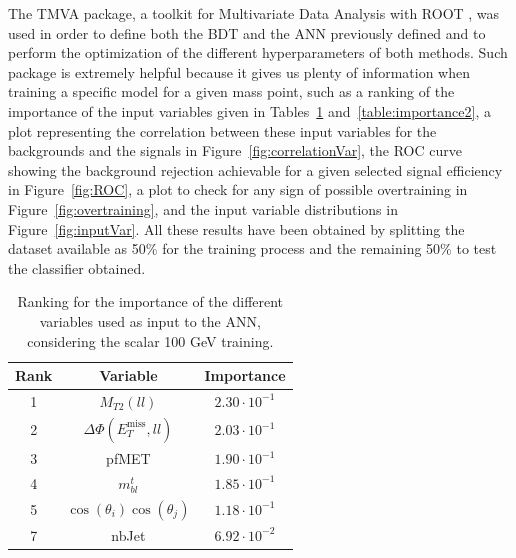 \documentclass[a4paper, 10pt, openright]{report}
\begin{document}
The TMVA package, a toolkit for Multivariate Data Analysis with ROOT \cite{TMVA}, was used in order to define both the \ac{BDT} and the \ac{ANN} previously defined and to perform the optimization of the different hyperparameters of both methods. Such package is extremely helpful because it gives us plenty of information when training a specific model for a given mass point, such as a ranking of the importance of the input variables given in Tables~\ref{table:importance1} and~\ref{table:importance2}, a plot representing the correlation between these input variables for the backgrounds and the signals in Figure~\ref{fig:correlationVar}, the \ac{ROC} curve showing the background rejection achievable for a given selected signal efficiency in Figure~\ref{fig:ROC}, a plot to check for any sign of possible overtraining in Figure~\ref{fig:overtraining}, and the input variable distributions in Figure~\ref{fig:inputVar}. All these results have been obtained by splitting the dataset available as 50\% for the training process and the remaining 50\% to test the classifier obtained. 

\begin{table}
\begin{center}
\begin{tabular}{ c|c|c } 
\hline
 Rank & Variable & Importance \\
 \hline
 1 & $M_{T2}(ll)$ & $2.30 \cdot 10^{-1}$ \\
 2 & $\Delta \Phi(E_{T}^{\text{miss}}, ll)$ & $2.03 \cdot 10^{-1}$ \\
 3 & pf\ac{MET} & $1.90 \cdot 10^{-1}$ \\
 4 & $m_{bl}^t$ & $1.85 \cdot 10^{-1}$ \\
 5 & $\cos(\theta_i) \cos(\theta_j)$ & $1.18 \cdot 10^{-1}$ \\
 7 & nbJet & $6.92 \cdot 10^{-2}$ \\
\hline
\end{tabular}
\caption{Ranking for the importance of the different variables used as input to the \ac{ANN}, considering the scalar 100 GeV training.}
\label{table:importance1}
\end{center}
\end{table}
\end{document}
